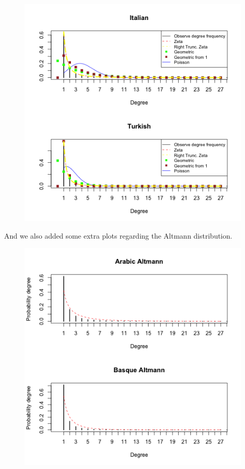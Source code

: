 \documentclass[paper=a4, fontsize=11pt]{scrartcl} %
\theoremstyle{plain}
\begin{document}
\begin{figure}[htbp] %
   \centering
   \includegraphics[width=\textwidth]{General_5} %
\end{figure}

And we also added some extra plots regarding the Altmann distribution.

\begin{figure}[htbp] %
   \centering
   \includegraphics[width=\textwidth]{Altman_1} %
\end{figure}
\end{document}
